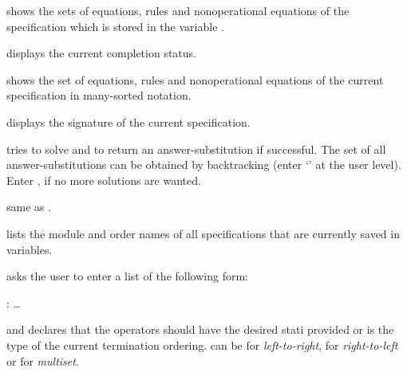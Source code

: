 \begin{command}
shows the sets of equations, rules and nonoperational equations 
of the specification which is stored in the variable 
.
\end{command}

 
\begin{command}
displays the current completion status.
\end{command}

\begin{command}
shows the set of equations, rules and nonoperational equations of the 
current specification in many-sorted notation.
\end{command}
 
\begin{command}
displays the signature of the current specification.
\end{command}

\begin{command}
tries to solve  and to return an answer-substitution if
successful. The set of all answer-substitutions can be obtained by
backtracking (enter `\user{;}' at the user level). Enter
, if no more solutions are wanted.
\end{command}

\begin{command}
same as .
\end{command}

\begin{command}
lists the module and order names of all specifications that are currently
saved in variables.
\end{command}

\begin{command}
asks the user to enter a list of the following form:
\begin{center}
\kw{[} : \kw{,} \ldots \kw{]}
\end{center}
and declares that the operators should have the desired stati provided 
or 
is the type of the current termination ordering.  can be
 for {\em left-to-right},
 for {\em right-to-left} or
 for {\em multiset}.
\end{command}

